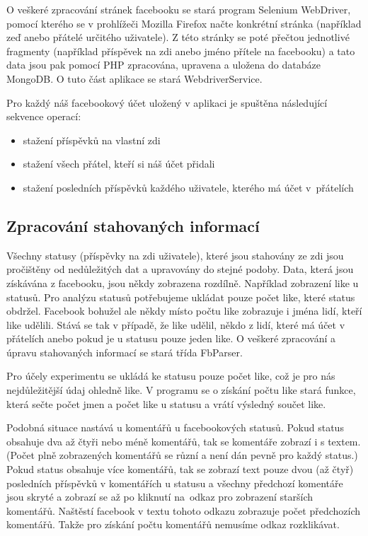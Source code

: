 \documentclass[thesis=M,czech]{FITthesis}[2013/05/10]
\begin{document}
O veškeré zpracování stránek facebooku se stará program Selenium WebDriver, pomocí kterého se v prohlížeči Mozilla Firefox načte konkrétní stránka (například zeď anebo přátelé určitého uživatele). Z této stránky se poté přečtou jednotlivé fragmenty (například příspěvek na zdi anebo jméno přítele na facebooku) a tato data jsou pak pomocí PHP zpracována, upravena a uložena do databáze MongoDB. O tuto část aplikace se stará WebdriverService.

Pro každý náš facebookový účet uložený v aplikaci je spuštěna následující sekvence operací:

\begin{itemize}
  \item stažení příspěvků na vlastní zdi
  \item stažení všech přátel, kteří si náš účet přidali
  \item stažení posledních příspěvků každého uživatele, kterého má účet v~přátelích
\end{itemize}

\subsection{Zpracování stahovaných informací}

Všechny statusy (příspěvky na zdi uživatele), které jsou stahovány ze zdi jsou pročištěny od nedůležitých dat a upravovány do stejné podoby. Data, která jsou získávána z facebooku, jsou někdy zobrazena rozdílně. Například zobrazení like u statusů. Pro analýzu statusů potřebujeme ukládat pouze počet like, které status obdržel. Facebook bohužel ale někdy místo počtu like zobrazuje i jména lidí, kteří like udělili. Stává se tak v případě, že like udělil, někdo z lidí, které má účet v přátelích anebo pokud je u statusu pouze jeden like. O veškeré zpracování a úpravu stahovaných informací se stará třída FbParser.

Pro účely experimentu se ukládá ke statusu pouze počet like, což je pro nás nejdůležitější údaj ohledně like. V programu se o získání počtu like stará funkce, která sečte počet jmen a počet like u statusu a vrátí výsledný součet like. 

Podobná situace nastává u komentářů u facebookových statusů. Pokud status obsahuje dva až čtyři nebo méně komentářů, tak se komentáře zobrazí i s textem. (Počet plně zobrazených komentářů se různí a není dán pevně pro každý status.) Pokud status obsahuje  více komentářů, tak se zobrazí text pouze dvou (až čtyř) posledních příspěvků v komentářích u statusu a všechny předchozí komentáře jsou skryté a zobrazí se až po kliknutí na~odkaz pro zobrazení starších komentářů. Naštěstí facebook v textu tohoto odkazu zobrazuje počet předchozích komentářů. Takže pro získání počtu komentářů nemusíme odkaz rozklikávat. 
\end{document}
